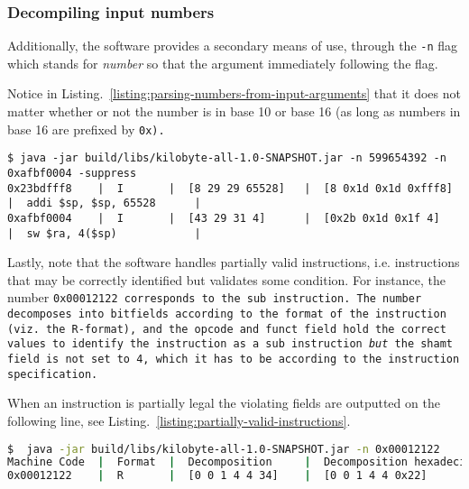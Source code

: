 \subsubsection{Decompiling input numbers}

Additionally, the software provides a secondary means of use, through
the \texttt{-n} flag which stands for \emph{number} so that the argument
immediately following the flag.

Notice in Listing.~\ref{listing:parsing-numbers-from-input-arguments}
that it does not matter whether or not the number is in base 10 or
base 16 (as long as numbers in base 16 are prefixed by \tt{0x}).

\begin{landscape}
\thispagestyle{empty}
\begin{lstlisting}[style=plain,
    basicstyle=\small,
    caption=Parsing numbers from input arguments using the \texttt{-n} flag,
    label=listing:parsing-numbers-from-input-arguments]
$ java -jar build/libs/kilobyte-all-1.0-SNAPSHOT.jar -n 599654392 -n 0xafbf0004 -suppress
0x23bdfff8    |  I       |  [8 29 29 65528]   |  [8 0x1d 0x1d 0xfff8]       |  addi $sp, $sp, 65528      |  
0xafbf0004    |  I       |  [43 29 31 4]      |  [0x2b 0x1d 0x1f 4]         |  sw $ra, 4($sp)            |
\end{lstlisting}
\end{landscape}

Lastly, note that the software handles partially valid instructions,
i.e. instructions that may be correctly identified but validates some
condition. For instance, the number \tt{0x00012122} corresponds to the
\tt{sub} instruction. The number decomposes into bitfields according
to the format of the instruction (viz. the R-format), and the opcode
and funct field hold the correct values to identify the instruction as
a \tt{sub} instruction \emph{but} the \tt{shamt} field is not set to
4, which it has to be according to the instruction specification.

When an instruction is partially legal the violating fields are outputted
on the following line, see Listing.~\ref{listing:partially-valid-instructions}.

\begin{minipage}{\linewidth}
\begin{lstlisting}[basicstyle=\small, 
    language=bash, 
    caption=Error print-outs for partially valid instructions,
    label=listing:partially-valid-instructions,
  backgroundcolor=\color{mintedbackground}]
$  java -jar build/libs/kilobyte-all-1.0-SNAPSHOT.jar -n 0x00012122
Machine Code  |  Format  |  Decomposition     |  Decomposition hexadecimal  |  Source                    |  Errors
0x00012122    |  R       |  [0 0 1 4 4 34]    |  [0 0 1 4 4 0x22]           |  sub $a0, $zero, $at       |   error(s)=["Expected shamt to be zero. Got 4"]
\end{lstlisting}
\end{minipage}
